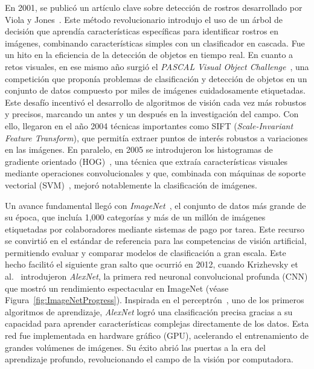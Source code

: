 \documentclass[12pt,letterpaper]{article}
\begin{document}
En 2001, se publicó un artículo clave sobre detección de rostros desarrollado por Viola y Jones~\cite{ViolaAndJones}. Este método revolucionario introdujo el uso de un árbol de decisión que aprendía características específicas para identificar rostros en imágenes, combinando características simples con un clasificador en cascada. 
Fue un hito en la eficiencia de la detección de objetos en tiempo real.
En cuanto a retos visuales, en ese mismo año surgió el \textit{PASCAL Visual Object Challenge}~\cite{PascalVisualObjectChallenge}, 
una competición que proponía problemas de clasificación y detección de objetos en un conjunto de datos compuesto por miles de imágenes cuidadosamente etiquetadas. 
Este desafío incentivó el desarrollo de algoritmos de visión cada vez más robustos y precisos, marcando un antes y un después en la investigación del campo.
Con ello, llegaron en el año 2004 técnicas importantes como SIFT (\textit{Scale-Invariant Feature Transform})\cite{SIFT}, que permitía extraer puntos de interés robustos a variaciones en las imágenes.
En paralelo, en 2005 se introdujeron los histogramas de gradiente orientado (HOG)~\cite{Dalal2005}, 
una técnica que extraía características visuales mediante operaciones convolucionales y que, combinada con máquinas de soporte vectorial (SVM)~\cite{SVM}, mejoró notablemente la clasificación de imágenes.

Un avance fundamental llegó con \textit{ImageNet}~\cite{ImageNet}, el conjunto de datos más grande de su época, que incluía 1,000 categorías y más de un millón de imágenes etiquetadas por colaboradores mediante sistemas de pago por tarea. Este recurso se convirtió en el estándar de referencia para las competencias de visión artificial, permitiendo evaluar y comparar modelos de clasificación a gran escala.
Este hecho facilitó el siguiente gran salto que ocurrió en 2012, cuando Krizhevsky et al.~\cite{AlexNet} introdujeron \textit{AlexNet}, la primera red neuronal convolucional profunda (CNN) que mostró un rendimiento espectacular en ImageNet (véase Figura~\ref{fig:ImageNetProgress}). 
Inspirada en el perceptrón~\cite{Perceptron}, uno de los primeros algoritmos de aprendizaje, \textit{AlexNet} logró una clasificación precisa gracias a su capacidad 
para aprender características complejas directamente de los datos. Esta red fue implementada en hardware gráfico (GPU), acelerando el entrenamiento de grandes volúmenes de imágenes. 
Su éxito abrió las puertas a la era del aprendizaje profundo, revolucionando el campo de la visión por computadora.
\end{document}
